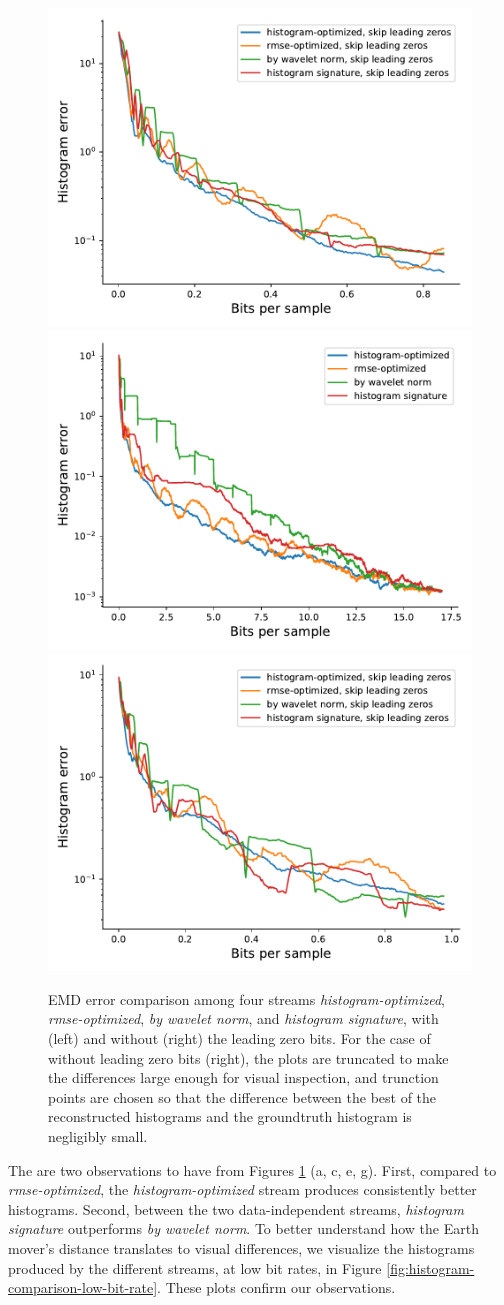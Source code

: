 \begin{figure}
	{\includegraphics[width=0.48\linewidth]{img/histogram/skip-leading-zeros/miranda-diffusivity-histogram.pdf}}
	{\includegraphics[width=0.48\linewidth]{img/histogram/turbulence-histogram.pdf}}
	{\includegraphics[width=0.48\linewidth]{img/histogram/skip-leading-zeros/turbulence-histogram.pdf}}
	\caption{EMD error comparison among four streams \emph{histogram-optimized},
	\emph{rmse-optimized}, \emph{by wavelet norm}, and \emph{histogram signature}, with (left) and
	without (right)	the leading zero bits. For the case of without leading zero bits (right), the
	plots are truncated to make the differences large enough for visual inspection, and trunction
	points are chosen so that the difference between the best of the reconstructed histograms and the
	groundtruth histogram is negligibly small.}
	\label{fig:histogram-stream-comparison}
\end{figure}

The are two observations to have from Figures \ref{fig:histogram-stream-comparison} (a, c, e, g).
First, compared to \emph{rmse-optimized}, the \emph{histogram-optimized} stream produces
consistently better histograms. Second, between the two data-independent streams, \emph{histogram
signature} outperforms \emph{by wavelet norm}. To better understand how the Earth mover's distance
translates to visual differences, we visualize the histograms produced by the different streams, at
low bit rates, in Figure \ref{fig:histogram-comparison-low-bit-rate}. These plots confirm our
observations.

